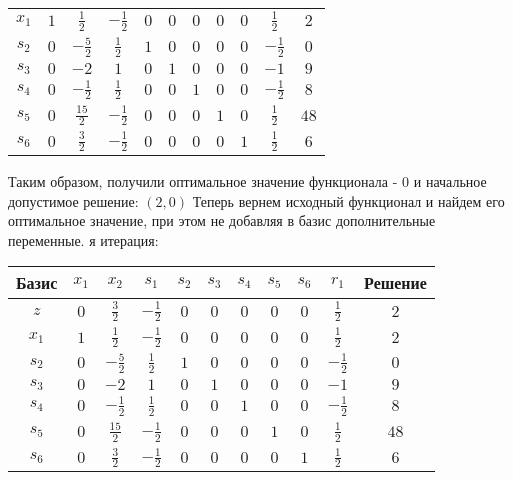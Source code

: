 \documentclass{article}%
\begin{document}
\begin{flushleft}
\begin{tabular}{|c|ccccccccc|c|}
\hline%
$x_{1}$&$1$&$\frac{1}{2}$&$-\frac{1}{2}$&$0$&$0$&$0$&$0$&$0$&$\frac{1}{2}$&$2$\\%
$s_{2}$&$0$&$-\frac{5}{2}$&$\frac{1}{2}$&$1$&$0$&$0$&$0$&$0$&$-\frac{1}{2}$&$0$\\%
$s_{3}$&$0$&$-2$&$1$&$0$&$1$&$0$&$0$&$0$&$-1$&$9$\\%
$s_{4}$&$0$&$-\frac{1}{2}$&$\frac{1}{2}$&$0$&$0$&$1$&$0$&$0$&$-\frac{1}{2}$&$8$\\%
$s_{5}$&$0$&$\frac{15}{2}$&$-\frac{1}{2}$&$0$&$0$&$0$&$1$&$0$&$\frac{1}{2}$&$48$\\%
$s_{6}$&$0$&$\frac{3}{2}$&$-\frac{1}{2}$&$0$&$0$&$0$&$0$&$1$&$\frac{1}{2}$&$6$\\%
\hline%
\end{tabular}%
\newline%
\newline%
Таким образом, получили оптимальное значение функционала {-} 0 и начальное допустимое решение: %
$(2, 0)$%
\newline%
Теперь вернем исходный функционал и найдем его оптимальное значение, при этом не добавляя в базис дополнительные переменные.%
я итерация: %
\newline%
\newline%
\renewcommand{\arraystretch}{1.3}%
\begin{tabular}{|c|ccccccccc|c|}%
\hline%
Базис&$x_{1}$&$x_{2}$&$s_{1}$&$s_{2}$&$s_{3}$&$s_{4}$&$s_{5}$&$s_{6}$&$r_{1}$&Решение\\%
\hline%
$z$&$0$&$\frac{3}{2}$&$-\frac{1}{2}$&$0$&$0$&$0$&$0$&$0$&$\frac{1}{2}$&$2$\\%
\hline%
$x_{1}$&$1$&$\frac{1}{2}$&$-\frac{1}{2}$&$0$&$0$&$0$&$0$&$0$&$\frac{1}{2}$&$2$\\%
$s_{2}$&$0$&$-\frac{5}{2}$&$\frac{1}{2}$&$1$&$0$&$0$&$0$&$0$&$-\frac{1}{2}$&$0$\\%
$s_{3}$&$0$&$-2$&$1$&$0$&$1$&$0$&$0$&$0$&$-1$&$9$\\%
$s_{4}$&$0$&$-\frac{1}{2}$&$\frac{1}{2}$&$0$&$0$&$1$&$0$&$0$&$-\frac{1}{2}$&$8$\\%
$s_{5}$&$0$&$\frac{15}{2}$&$-\frac{1}{2}$&$0$&$0$&$0$&$1$&$0$&$\frac{1}{2}$&$48$\\%
$s_{6}$&$0$&$\frac{3}{2}$&$-\frac{1}{2}$&$0$&$0$&$0$&$0$&$1$&$\frac{1}{2}$&$6$\\%
\hline%
\end{tabular}%
\newline%
\newline%
\newline%

\end{flushleft}
\end{document}
